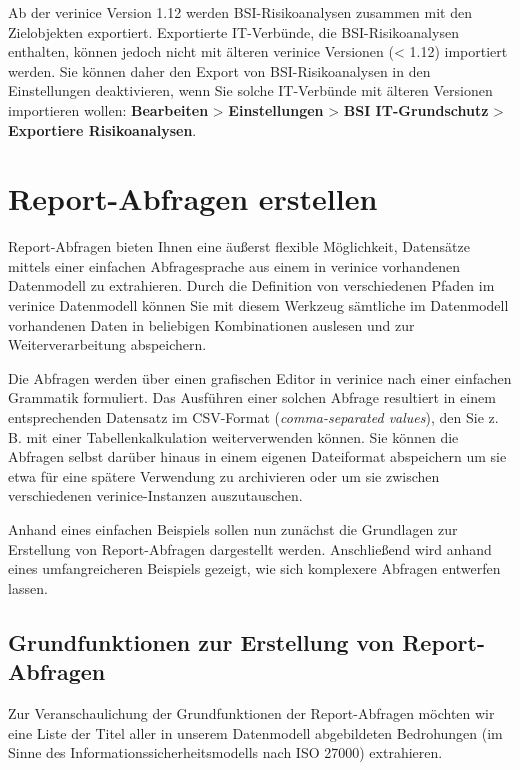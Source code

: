 \documentclass[a4paper,10pt]{book}
\newcommand{\zB}{\mbox{z.\,B.}\xspace}
\begin{document}
Ab der verinice Version 1.12 werden BSI-Risikoanalysen zusammen mit den
Zielobjekten exportiert. Exportierte IT-Verbünde, die BSI-Risikoanalysen
enthalten, können jedoch nicht mit älteren verinice Versionen (< 1.12)
importiert werden. Sie können daher den Export von BSI-Risikoanalysen in den
Einstellungen deaktivieren, wenn Sie solche IT-Verbünde mit älteren Versionen
importieren wollen: \textbf{Bearbeiten} \textgreater \textbf{ Einstellungen}
\textgreater \textbf{ BSI IT-Grundschutz} \textgreater \textbf{ Exportiere
Risikoanalysen}.


\section{Report-Abfragen erstellen}\label{report-abfragen-erstellen}

Report-Abfragen bieten Ihnen eine äußerst flexible Möglichkeit, Datensätze
mittels einer einfachen Abfragesprache aus einem in verinice vorhandenen
Datenmodell zu extrahieren. Durch die Definition von verschiedenen Pfaden im
verinice Datenmodell können Sie mit diesem Werkzeug sämtliche im Datenmodell
vorhandenen Daten in beliebigen Kombinationen auslesen und zur
Weiterverarbeitung abspeichern.

Die Abfragen werden über einen grafischen Editor in verinice nach einer
einfachen Grammatik formuliert. Das Ausführen einer solchen Abfrage resultiert
in einem entsprechenden Datensatz im CSV-Format (\emph{comma-separated values}),
den Sie \zB mit einer Tabellenkalkulation weiterverwenden können. Sie können die
Abfragen selbst darüber hinaus in einem eigenen Dateiformat abspeichern um sie
etwa für eine spätere Verwendung zu archivieren oder um sie zwischen
verschiedenen verinice-Instanzen auszutauschen.

Anhand eines einfachen Beispiels sollen nun zunächst die Grundlagen zur
Erstellung von Report-Abfragen dargestellt werden. Anschließend wird anhand
eines umfangreicheren Beispiels gezeigt, wie sich komplexere Abfragen entwerfen
lassen.

\subsection{Grundfunktionen zur Erstellung von
Report-Abfragen}\label{grundfunktionen-zur-erstellung-von-report-abfragen}

Zur Veranschaulichung der Grundfunktionen der Report-Abfragen möchten wir eine
Liste der Titel aller in unserem Datenmodell abgebildeten Bedrohungen (im Sinne
des Informationssicherheitsmodells nach ISO 27000) extrahieren.
\end{document}
